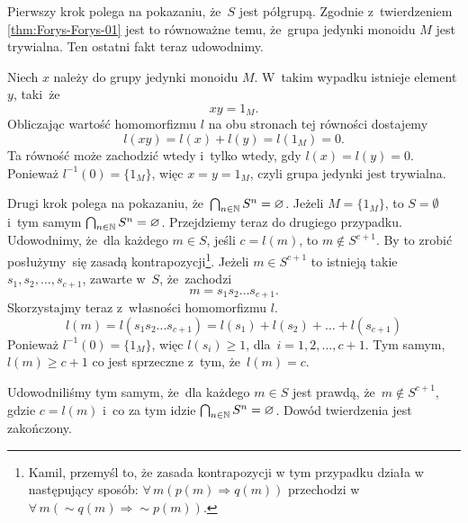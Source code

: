 \documentclass[a4paper,11pt]{article}
\begin{document}
Pierwszy krok polega na pokazaniu, że~$S$ jest półgrupą. Zgodnie
z~twierdzeniem \eqref{thm:Forys-Forys-01} jest to równoważne temu,
że~grupa jedynki monoidu $M$ jest trywialna. Ten ostatni fakt teraz
udowodnimy.

Niech $x$ należy do grupy jedynki monoidu $M$. W~takim wypadku
istnieje element $y$, taki~że
\begin{equation}
  \label{eq:Forys-Forys-55}
  x y = 1_{ M }.
\end{equation}
Obliczając wartość homomorfizmu $l$ na obu stronach tej równości
dostajemy
\begin{equation}
  \label{eq:Forys-Forys-56}
  l( x y ) = l( x ) + l( y ) = l( 1_{ M } ) = 0.
\end{equation}
Ta równość może zachodzić wtedy i~tylko wtedy, gdy
$l( x ) = l( y ) = 0$. Ponieważ $l^{ -1 }( 0 ) = \{ 1_{ M } \}$, więc
$x = y = 1_{ M }$, czyli grupa jedynki jest trywialna.

Drugi krok polega na pokazaniu,
że~$\bigcap_{ n \in \mathbb{N} } S^{ n } = \varnothing$. Jeżeli
$M = \{ 1_{ M } \}$, to $S = \emptyset$ i~tym samym
$\bigcap_{ n \in \mathbb{N} } S^{ n } = \varnothing$. Przejdziemy teraz do
drugiego przypadku. Udowodnimy, że~dla każdego $m \in S$, jeśli
$c = l( m )$, to $m \notin S^{ c + 1 }$. By to zrobić posłużymy~się
zasadą kontrapozycji\footnote{Kamil, przemyśl to, że zasada
  kontrapozycji w tym przypadku działa w następujący sposób:
  $\forall \, m ( p( m ) \Rightarrow q( m ) )$ przechodzi
  w~$\forall \, m ( \sim q( m ) \Rightarrow \sim p( m ) )$.}. Jeżeli
$m \in S^{ c + 1 }$ to istnieją takie
$s_{ 1 }, s_{ 2 }, \ldots, s_{ c + 1 }$, zawarte w~$S$, że~zachodzi
\begin{equation}
  \label{eq:Forys-Forys-57}
  m = s_{ 1 } s_{ 2 } \ldots s_{ c + 1 }.
\end{equation}
Skorzystajmy teraz z~własności homomorfizmu $l$.
\begin{equation}
  \label{eq:Forys-Forys-58}
  l( m ) = l( s_{ 1 } s_{ 2 } \ldots s_{ c + 1 } ) =
  l( s_{ 1 } ) + l( s_{ 2 } ) + \ldots + l( s_{ c + 1 } )
\end{equation}
Ponieważ $l^{ -1 }( 0 ) = \{ 1_{ M } \}$, więc $l( s_{ i } ) \geq 1$,
dla~$i = 1, 2, \ldots, c + 1$. Tym samym, $l( m ) \geq c + 1$ co jest
sprzeczne z~tym, że~$l( m ) = c$.

Udowodniliśmy tym samym, że~dla każdego $m \in S$ jest prawdą,
że~$m \notin S^{ c + 1 }$, gdzie $c = l( m )$ i~co za tym idzie
$\bigcap_{ n \in \mathbb{N} } S^{ n } = \varnothing$. Dowód twierdzenia jest zakończony.
\end{document}

